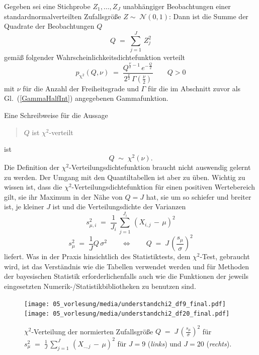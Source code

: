 Gegeben sei eine Stichprobe $Z_1, \dots, Z_J$ unabhängiger Beobachtungen einer
standardnormalverteilten Zufallsgröße $Z  \sim \; \mathcal{N}(0, 1)$:
Dann ist die Summe der Quadrate der Beobachtungen $Q$
\begin{equation}
Q \; = \; \sum_{j=1}^J \, Z_j^2
\end{equation}
gemäß folgender Wahrscheinlichkeitsdichtefunktion verteilt
\begin{equation}
p_\mathrm{\chi^2}(Q, \nu) \; = \; \frac{Q^{\frac{\nu}{2} - 1} \,
 e^{-\frac{Q}{2}}}{2^{\frac{\nu}{2}} \, \Gamma(\frac{\nu}{2})} \qquad Q > 0
\label{Chi2pdf}
\end{equation}
mit $\nu$ für die Anzahl der Freiheitsgrade und $\Gamma$ für die
im Abschnitt zuvor als Gl.~(\ref{GammaHalfInt}) angegebenen Gammafunktion.

Eine Schreibweise für die Aussage
\begin{quote}
$Q$ ist $\chi^2$-verteilt
\end{quote}
ist
\begin{equation}
Q \; \sim \; \chi^2(\nu).
\label{Chi2verteilt}
\end{equation}
Die Definition der $\chi^2$-Verteilungsdichtefunktion braucht nicht auswendig gelernt zu
werden. Der Umgang mit den Quantiltabellen ist aber zu üben.
Wichtig zu wissen ist, dass die $\chi^2$-Verteilungs\-dichte\-funktion für
einen positiven Wertebereich gilt, sie ihr Maximum in der Nähe von $Q = J$ hat, sie um so
schiefer und breiter ist, je kleiner $J$ ist und die Verteilungsdichte der Varianzen
\begin{equation}
s_{\mu,i}^2 \; = \; \frac{1}{J_i} \, \sum_{j=1}^{J_i} \, (X_{i,j} \, - \, \mu)^2
\end{equation}
\begin{equation}
s_{\mu}^2 \; = \; \frac{1}{J} Q \, \sigma^2  \qquad \Leftrightarrow \qquad
Q \; = \; J \, \left( \frac{s_{\mu}}{\sigma} \right)^2
\label{s2Q}
\end{equation}
liefert. Was in der Praxis hinsichtlich des Statistiktests, dem $\chi^2$-Test, gebraucht wird,
ist das Verständnis wie die Tabellen verwendet werden
und für Methoden der bayesischen Statistik erforderlichenfalls auch wie die
Funktionen der jeweils eingesetzten Numerik-/Statistik\-biblio\-theken zu benutzen sind.

\begin{figure}
\begin{center}
\texttt{[image: 05\_vorlesung/media/understandchi2\_df9\_final.pdf]} \hspace{5mm}
\texttt{[image: 05\_vorlesung/media/understandchi2\_df20\_final.pdf]}
\caption{\label{ch2beispiele}$\chi^2$-Verteilung der normierten
Zufallsgröße $Q \; = \; J \, \left( \frac{s_{\mu}}{\sigma} \right)^2$ für
$s_{\mu}^2 \; = \; \frac{1}{J} \, \sum_{j=1}^{J} \, (X_{..,j} \, - \, \mu)^2$
für $J = 9$  (\textsl{links}) und $J = 20$ (\textsl{rechts}).}
\end{center}
\end{figure}

